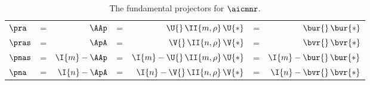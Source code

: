 \begin{table}[htdp]
\caption[The fundamental projectors for $\aicmnr$]{The fundamental projectors for $\aicmnr$.}
\begin{center}
\begin{tabular}{lcrcrcr}
%
%
  $\pra$ & = & $\AAp$         & = & $\U{}\,\II{m,\rho}\,\U{*}$ & = & $\bur{} \,\bur{*}$ \\
%
  $\pras$  & = & $\ApA$         & = & $\V{}\,\II{n,\rho}\,\V{*}$ & = & $\bvr{} \,\bvr{*}$ \\
%
  $\pnas$  & = & $\I{m} - \AAp$ & = & $\I{m} - \U{}\,\II{m,\rho}\,\U{*}$ & = & $\I{m} - \bur{} \,\bur{*}$ \\
%
  $\pna$   & = & $\I{n} - \ApA$ & = & $\I{n} - \V{}\,\II{n,\rho}\,\V{*}$ & = & $\I{n} - \bvr{} \,\bvr{*}$ \\
%
\end{tabular}
\end{center}
\label{tab:projectors:definitions}
\end{table}

\endinput